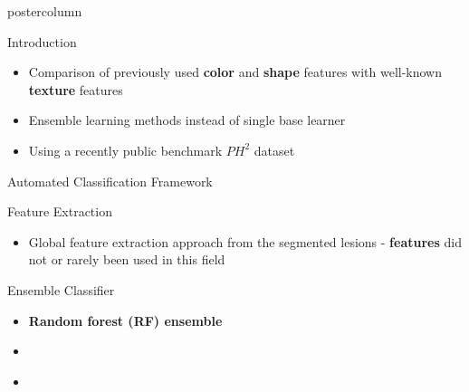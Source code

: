 \documentclass[final]{beamer}
\begin{document}
\begin{frame}
\begin{columns}
\begin{column}{.49\textwidth}
\begin{beamercolorbox}[center,wd=\textwidth]{postercolumn}
\begin{minipage}[T]{.95\textwidth}
{\begin{block}{Introduction}
\begin{itemize}
               \begin{itemize}
                \item Comparison of previously used \textbf{color} and \textbf{shape} features with well-known \textbf{texture} features
                \item Ensemble learning methods instead of single base learner
                \item Using a recently public benchmark \textbf{$PH^{2}$} dataset
               \end{itemize}
               
              \end{itemize}
      
            \end{block}
            \vfill
            \begin{block}{Automated Classification Framework}
            	           
            \end{block}
            \vfill
            \begin{block}{Feature Extraction}
            \begin{itemize}
             \item Global feature extraction approach from the segmented lesions - \textbf{features} did not or rarely been used in this field 
            \end{itemize}
                
            \end{block}
            \vfill
            \begin{block}{Ensemble Classifier}
            \begin{itemize}
            	\item \textbf{\color{orounam}Random forest (RF) ensemble}
            	\item []
            	\item []
            	\begin{columns}
            		\begin{column}{.54\textwidth}
            		\\

\end{column}
\end{columns}
\end{itemize}
\end{block}}
\end{minipage}
\end{beamercolorbox}
\end{column}
\end{columns}
\end{frame}
\end{document}
